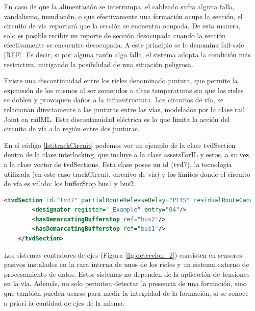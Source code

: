     En caso de que la alimentación se interrumpa, el cableado sufra alguna falla, vandalismo, inundación, o que efectivamente una formación ocupe la sección, el circuito de vía reportará que la sección se encuentra ocupada. De esta manera, solo es posible recibir un reporte de sección desocupada cuando la sección efectivamente se encuentre desocupada. A este principio se le denomina fail-safe [REF]. Es decir, si por alguna razón algo falla, el sistema adopta la condición más restrictiva, mitigando la posibilidad de una situación peligrosa. 
    
    Existe una discontinuidad entre los rieles denominado juntura, que permite la expansión de los mismos al ser sometidos a altas temperaturas sin que los rieles se doblen y provoquen daños a la infraestructura. Los circuitos de vía, se relacionan directamente a las junturas entre las vías, modelados por la clase rail Joint en railML.  Esta discontinuidad eléctrica es lo que limita la acción del circuito de vía a la región entre dos junturas.

    En el código \ref{lst:trackCircuit} podemos ver un ejemplo de la clase tvdSection dentro de la clase interlocking, que incluye a la clase assetsForIL y estos, a su vez, a la clase vector de tvdSections. Esta clase posee un id (tvd7), la tecnología utilizada (en este caso trackCircuit, circuivo de vía) y los límites donde el circuito de vía es válido: los bufferStop bus1 y bus2.

    \begin{lstlisting}[language = XML, caption = Clase trackCircuit , label = {lst:trackCircuit}]
    <tvdSection id="tvd7" partialRouteReleaseDelay="PT4S" residualRouteCancellationDelay="PT90S" technology="trackCircuit" isBerthingTrack="false">
        <designator register="_Example" entry="04"/>
        <hasDemarcatingBufferstop ref="bus2"/>
        <hasDemarcatingBufferstop ref="bus1"/>
    </tvdSection>
    \end{lstlisting}

    Los sistemas contadores de ejes (Figura \ref{fig:deteccion_2}) consisten en sensores pasivos instalados en la cara interna de unos de los rieles y un sistema externo de procesamiento de datos. Estos sistemas no dependen de la aplicación de tensiones en la vía. Además, no solo permiten detectar la presencia de una formación, sino que también pueden usarse para medir la integridad de la formación, si se conoce a priori la cantidad de ejes de la misma. 

